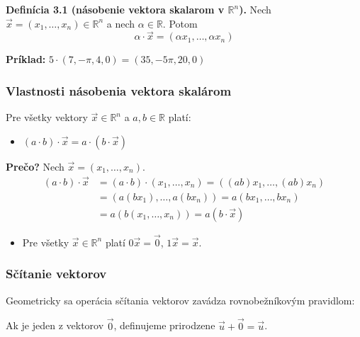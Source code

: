 \documentclass[11pt]{article}
\renewcommand{\vec}[1]{\overrightarrow{#1}}
\newcommand{\R}{\mathbb{R}}
\begin{document}
\vspace{1em}
\noindent\textbf{Definícia 3.1 (násobenie vektora skalarom v $\R^n$).}
Nech $\vec{x}=(x_1, \dots, x_n) \in \R^n$ a nech $\alpha \in \R$. Potom
$$ \alpha \cdot \vec{x} = (\alpha x_1, \dots, \alpha x_n) $$

\noindent\textbf{Príklad:} $5 \cdot (7, -\pi, 4, 0) = (35, -5\pi, 20, 0)$

\subsubsection{Vlastnosti násobenia vektora skalárom}
Pre všetky vektory $\vec{x} \in \R^n$ a $a,b \in \R$ platí:
\begin{itemize}
    \item $(a \cdot b) \cdot \vec{x} = a \cdot (b \cdot \vec{x})$
\end{itemize}
\textbf{Prečo?} Nech $\vec{x}=(x_1, \dots, x_n)$.
\begin{align*}
(a \cdot b) \cdot \vec{x} &= (a \cdot b) \cdot (x_1, \dots, x_n) = ((ab)x_1, \dots, (ab)x_n) \\
&= (a(bx_1), \dots, a(bx_n)) = a(bx_1, \dots, bx_n) \\
&= a(b(x_1, \dots, x_n)) = a(b \cdot \vec{x})
\end{align*}
\begin{itemize}
    \item Pre všetky $\vec{x} \in \R^n$ platí $0\vec{x} = \vec{0}$, $1\vec{x} = \vec{x}$.
\end{itemize}

\hrulefill

\subsubsection{Sčítanie vektorov}
Geometricky sa operácia sčítania vektorov zavádza rovnobežníkovým pravidlom:
\begin{center}
\end{center}
Ak je jeden z vektorov $\vec{0}$, definujeme prirodzene $\vec{u}+\vec{0}=\vec{u}$.
\end{document}
